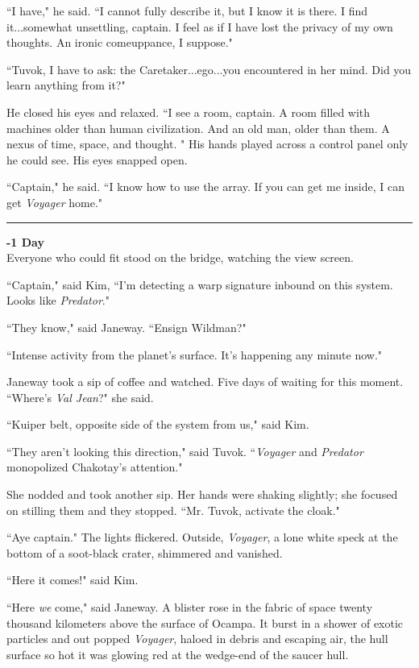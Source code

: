 \documentclass[twoside,letterpaper,12pt]{memoir}
\begin{document}
``I have," he said. ``I cannot fully describe it, but I know it is there. I find it...somewhat unsettling, captain. I feel as if I have lost the privacy of my own thoughts. An ironic comeuppance, I suppose." 

``Tuvok, I have to ask: the Caretaker...ego...you encountered in her mind. Did you learn anything from it?" 

He closed his eyes and relaxed. ``I see a room, captain. A room filled with machines older than human civilization. And an old man, older than them. A nexus of time, space, and thought. " His hands played across a control panel only he could see. His eyes snapped open. 

``Captain," he said. ``I know how to use the array. If you can get me inside, I can get \textit{Voyager} home." 

\begin{center}\rule{3cm}{0.4 pt}\end{center} 

\noindent\textbf{-1 Day}\\

Everyone who could fit stood on the bridge, watching the view screen. 

``Captain," said Kim, ``I'm detecting a warp signature inbound on this system. Looks like \textit{Predator}." 

``They know," said Janeway. ``Ensign Wildman?" 

``Intense activity from the planet's surface. It's happening any minute now." 

Janeway took a sip of coffee and watched. Five days of waiting for this moment. ``Where's \textit{Val Jean}?" she said. 

``Kuiper belt, opposite side of the system from us," said Kim. 

``They aren't looking this direction," said Tuvok. ``\textit{Voyager }and \textit{Predator} monopolized Chakotay's attention." 

She nodded and took another sip. Her hands were shaking slightly; she focused on stilling them and they stopped. ``Mr. Tuvok, activate the cloak." 

``Aye captain." The lights flickered. Outside, \textit{Voyager}, a lone white speck at the bottom of a soot-black crater, shimmered and vanished. 

``Here it comes!" said Kim. 

``Here \textit{we} come," said Janeway. A blister rose in the fabric of space twenty thousand kilometers above the surface of Ocampa. It burst in a shower of exotic particles and out popped \textit{Voyager}, haloed in debris and escaping air, the hull surface so hot it was glowing red at the wedge-end of the saucer hull. 
\end{document}
